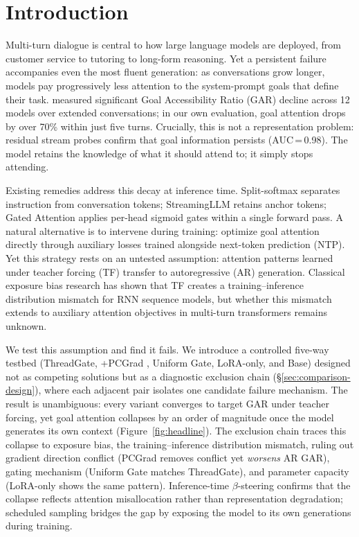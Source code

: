 \section{Introduction}\label{sec:introduction}

Multi-turn dialogue is central to how large language models are deployed, from customer service to tutoring to long-form reasoning. Yet a persistent failure accompanies even the most fluent generation: as conversations grow longer, models pay progressively less attention to the system-prompt goals that define their task. \citet{dongre2026attention} measured significant Goal Accessibility Ratio (GAR) decline across 12 models over extended conversations; in our own evaluation, goal attention drops by over 70\% within just five turns. Crucially, this is not a representation problem: residual stream probes confirm that goal information persists (AUC\,=\,0.98). The model retains the knowledge of what it should attend to; it simply stops attending.

Existing remedies address this decay at inference time. Split-softmax \citep{li2024measuring} separates instruction from conversation tokens; StreamingLLM \citep{xiao2024streaming} retains anchor tokens; Gated Attention \citep{qiu2025gated} applies per-head sigmoid gates within a single forward pass. A natural alternative is to intervene during training: optimize goal attention directly through auxiliary losses trained alongside next-token prediction (NTP). Yet this strategy rests on an untested assumption: attention patterns learned under teacher forcing (TF) transfer to autoregressive (AR) generation. Classical exposure bias research \citep{bengio2015scheduled,lamb2016professor} has shown that TF creates a training--inference distribution mismatch for RNN sequence models, but whether this mismatch extends to auxiliary attention objectives in multi-turn transformers remains unknown.

We test this assumption and find it fails. We introduce a controlled five-way testbed (ThreadGate, +PCGrad \citep{yu2020pcgrad}, Uniform Gate, LoRA-only, and Base) designed not as competing solutions but as a diagnostic exclusion chain (\S\ref{sec:comparison-design}), where each adjacent pair isolates one candidate failure mechanism. The result is unambiguous: every variant converges to target GAR under teacher forcing, yet goal attention collapses by an order of magnitude once the model generates its own context (Figure~\ref{fig:headline}). The exclusion chain traces this collapse to exposure bias, the training--inference distribution mismatch, ruling out gradient direction conflict (PCGrad removes conflict yet \emph{worsens} AR GAR), gating mechanism (Uniform Gate matches ThreadGate), and parameter capacity (LoRA-only shows the same pattern). Inference-time $\beta$-steering confirms that the collapse reflects attention misallocation rather than representation degradation; scheduled sampling bridges the gap by exposing the model to its own generations during training.

